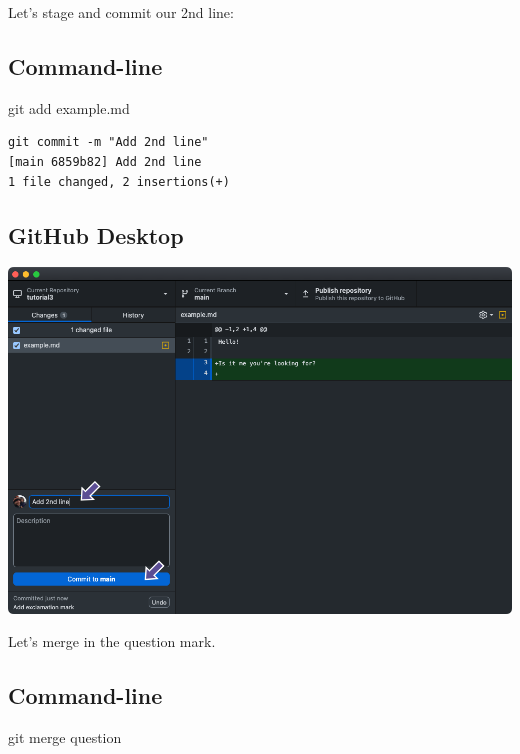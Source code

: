 \documentclass[
  letterpaper,
  DIV=11,
  numbers=noendperiod]{scrartcl}
\newenvironment{Shaded}{\begin{snugshade}}{\end{snugshade}}
\newcommand{\FunctionTok}[1]{\textcolor[rgb]{0.28,0.35,0.67}{#1}}
\newcommand{\NormalTok}[1]{\textcolor[rgb]{0.00,0.23,0.31}{#1}}
\begin{document}
Let's stage and commit our 2nd line:

\subsection{Command-line}

\begin{Shaded}
\begin{Highlighting}[]
\FunctionTok{git}\NormalTok{ add example.md}
\end{Highlighting}
\end{Shaded}

\begin{verbatim}
git commit -m "Add 2nd line"
[main 6859b82] Add 2nd line
1 file changed, 2 insertions(+)
\end{verbatim}

\subsection{GitHub Desktop}

\includegraphics{images/image42.png}

Let's merge in the question mark.

\subsection{Command-line}

\begin{Shaded}
\begin{Highlighting}[]
\FunctionTok{git}\NormalTok{ merge question}
\end{Highlighting}
\end{Shaded}
\end{document}
